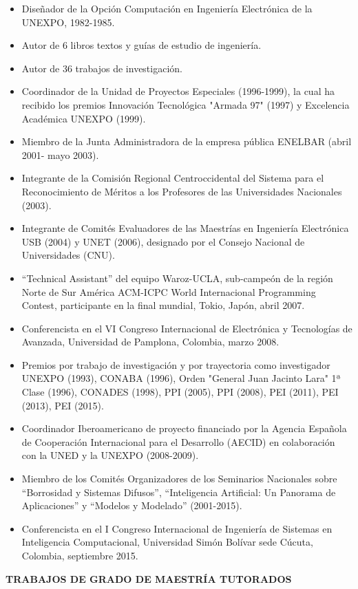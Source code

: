 \begin{footnotesize}
\begin{itemize}
 	\item Diseñador de la Opción Computación en Ingeniería Electrónica de la UNEXPO, 1982-1985.	
	\item Autor de 6 libros textos y guías de estudio de ingeniería.
	\item Autor de 36 trabajos de investigación.
	\item Coordinador de la Unidad de Proyectos Especiales (1996-1999), la cual ha recibido los premios  Innovación Tecnológica "Armada 97" (1997) y Excelencia Académica UNEXPO (1999). 
	\item Miembro de la Junta Administradora de la empresa pública ENELBAR (abril 2001- mayo 2003).
	\item Integrante de la Comisión Regional Centroccidental del Sistema para el Reconocimiento de Méritos a los Profesores de las Universidades Nacionales (2003). 
	\item Integrante de Comités Evaluadores de las Maestrías en Ingeniería Electrónica USB (2004) y UNET (2006), designado por el Consejo Nacional de Universidades (CNU). 
	\item “Technical Assistant” del equipo Waroz-UCLA, sub-campeón de la región Norte de Sur América ACM-ICPC World Internacional Programming Contest, participante en la final mundial, Tokio, Japón, abril 2007. 
	\item Conferencista en el VI Congreso Internacional de Electrónica y Tecnologías de Avanzada, Universidad de Pamplona, Colombia, marzo 2008. 
	\item Premios por trabajo de investigación y por trayectoria como investigador UNEXPO (1993), CONABA (1996), Orden "General Juan Jacinto Lara" 1ª Clase (1996), CONADES (1998), PPI (2005), PPI (2008), PEI (2011), PEI (2013), PEI (2015).
	\item Coordinador Iberoamericano de proyecto financiado por la Agencia Española de Cooperación Internacional para el Desarrollo (AECID) en colaboración con la UNED y la UNEXPO (2008-2009).
	\item Miembro de los Comités Organizadores de los Seminarios Nacionales sobre “Borrosidad y Sistemas Difusos”, “Inteligencia Artificial: Un Panorama de Aplicaciones” y “Modelos y Modelado” (2001-2015). 
    \item Conferencista en el I Congreso Internacional de Ingeniería de Sistemas en Inteligencia Computacional, Universidad Simón Bolívar sede Cúcuta, Colombia, septiembre 2015. 	
 	
 	\end{itemize}
\textbf{TRABAJOS DE GRADO DE MAESTRÍA TUTORADOS}


\end{footnotesize}
